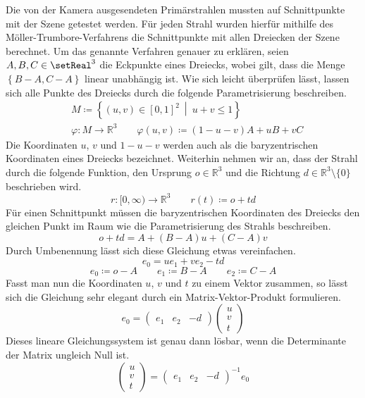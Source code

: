 \documentclass[crop=false]{standalone}
\begin{document}
      Die von der Kamera ausgesendeten Primärstrahlen mussten auf Schnittpunkte mit der Szene getestet werden.
      Für jeden Strahl wurden hierfür mithilfe des Möller-Trumbore-Verfahrens die Schnittpunkte mit allen Dreiecken der Szene berechnet.
      Um das genannte Verfahren genauer zu erklären, seien $A,B,C\in \setReal^3$ die Eckpunkte eines Dreiecks, wobei gilt, dass die Menge $\left\{ B-A,C-A \right\}$ linear unabhängig ist.
      Wie sich leicht überprüfen lässt, lassen sich alle Punkte des Dreiecks durch die folgende Parametrisierung beschreiben.
      \begin{align*}
        &M \coloneqq \left\{ (u,v)\in [0,1]^2 \ \middle|\ u+v \leq 1 \right\} \\
        &\varphi\colon M\to \mathds{R}^3 \qquad \varphi(u,v)\coloneqq (1-u-v)A + uB + vC
      \end{align*}
      Die Koordinaten $u$, $v$ und $1-u-v$ werden auch als die baryzentrischen Koordinaten eines Dreiecks bezeichnet.
      Weiterhin nehmen wir an, dass der Strahl durch die folgende Funktion, den Ursprung $o\in\mathds{R}^3$ und die Richtung $d\in\mathds{R}^3\setminus\{0\}$ beschrieben wird.
      \[
        r\colon [0,\infty) \to \mathds{R}^3
        \qquad
        r(t) \coloneqq o + td
      \]
      Für einen Schnittpunkt müssen die baryzentrischen Koordinaten des Dreiecks den gleichen Punkt im Raum wie die Parametrisierung des Strahls beschreiben.
      \[
        o + td = A + (B-A)u + (C-A)v
      \]
      Durch Umbenennung lässt sich diese Gleichung etwas vereinfachen.
      \[
        e_0 = ue_1 + ve_2 - td
      \]
      \[
        e_0 \coloneqq o - A
        \qquad
        e_1 \coloneqq B-A
        \qquad
        e_2 \coloneqq C-A
      \]
      Fasst man nun die Koordinaten $u$, $v$ und $t$ zu einem Vektor zusammen, so lässt sich die Gleichung sehr elegant durch ein Matrix-Vektor-Produkt formulieren.
      \[
        e_0 =
        \begin{pmatrix}
          e_1 &
          e_2 &
          -d
        \end{pmatrix}
        \begin{pmatrix}
          u \\
          v \\
          t
        \end{pmatrix}
      \]
      Dieses lineare Gleichungssystem ist genau dann lösbar, wenn die Determinante der Matrix ungleich Null ist.
      \[
        \begin{pmatrix}
          u \\
          v \\
          t
        \end{pmatrix}
        =
        \begin{pmatrix}
          e_1 &
          e_2 &
          -d
        \end{pmatrix}^{-1}
        e_0
      \]
\end{document}
